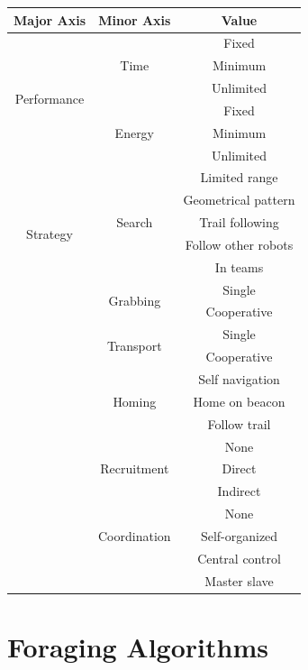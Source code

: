 \begin{tabular}{ | c | c | c |}
\hline
	Major Axis & Minor Axis & Value  \\ \hline
	\multirow{6}{*}{Performance}
		& \multirow{3}{*}{Time} 
			& Fixed \\  
		& 	& Minimum \\ 
		& 	& Unlimited \\ \cline{2-3}
		& \multirow{3}{*}{Energy} 
			& Fixed \\ 
		& 	& Minimum \\ 
		&	& Unlimited \\ \hline
	\multirow{6}{*}{Strategy}	
		& \multirow{5}{*}{Search} 
			& Limited range \\
		&	& Geometrical pattern\\
		&	& Trail following\\
		&	& Follow other robots\\
		&	& In teams\\ \cline{2-3}
		& \multirow{2}{*}{Grabbing} 
			& Single \\
		&	& Cooperative \\ \cline{2-3}
		& \multirow{2}{*}{Transport} 
			& Single \\
		&	& Cooperative \\ \cline{2-3}
		& \multirow{3}{*}{Homing} 
			& Self navigation \\
		&	& Home on beacon \\
		&	& Follow trail \\\cline{2-3}
		& \multirow{3}{*}{Recruitment} 
			& None \\
		&	& Direct \\
		&	& Indirect \\\cline{2-3}
		& \multirow{3}{*}{Coordination} 
			& None \\
		&	& Self-organized \\
		&	&  Central control \\
		&	& Master slave \\\hline
\end{tabular}




\section{Foraging Algorithms}
\label{sec:second:existingsolution}


